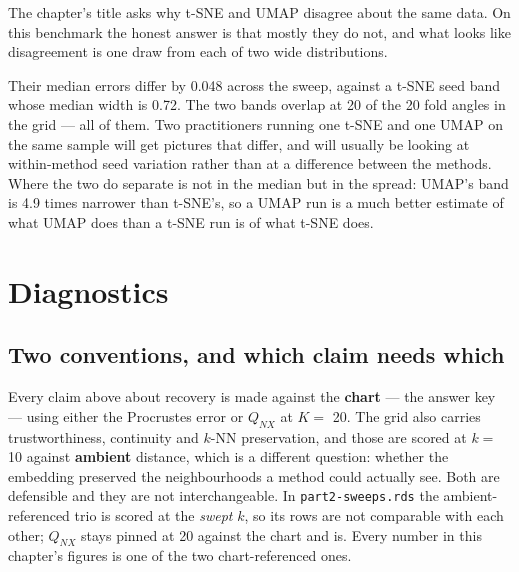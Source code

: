 \documentclass[
  british,
  a4paper,
]{book}
\begin{document}
The chapter's title asks why t-SNE and UMAP disagree about the same data. On
this benchmark the honest answer is that mostly they do not, and what looks
like disagreement is one draw from each of two wide distributions.

Their median errors differ by 0.048 across the sweep,
against a t-SNE seed band whose median width is
0.72. The two bands overlap at
20 of the 20 fold angles in the grid --- all of them.
Two practitioners running one t-SNE and one UMAP on the same sample will get
pictures that differ, and will usually be looking at within-method seed
variation rather than at a difference between the methods. Where the two do
separate is not in the median but in the spread: UMAP's band is
4.9 times narrower
than t-SNE's, so a UMAP run is a much better estimate of what UMAP does than a
t-SNE run is of what t-SNE does.

\section{Diagnostics}\label{nbr-diagnostics}

\subsection{Two conventions, and which claim needs which}\label{two-conventions-and-which-claim-needs-which}

Every claim above about recovery is made against the \textbf{chart} --- the answer key
--- using either the Procrustes error or \(Q_{NX}\) at \(K =\) 20. The grid
also carries trustworthiness, continuity and \(k\)-NN preservation, and those are
scored at \(k =\) 10 against \textbf{ambient} distance, which is a
different question: whether the embedding preserved the neighbourhoods a
method could actually see. Both are defensible and they are not
interchangeable. In \texttt{part2-sweeps.rds} the ambient-referenced trio is scored at
the \emph{swept} \(k\), so its rows are not comparable with each other; \(Q_{NX}\) stays
pinned at 20 against the chart and is. Every number in this chapter's
figures is one of the two chart-referenced ones.
\end{document}
